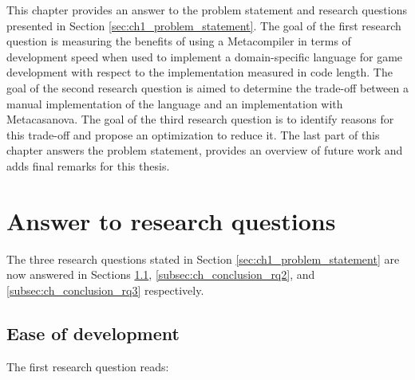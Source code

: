 This chapter provides an answer to the problem statement and research questions presented in Section \ref{sec:ch1_problem_statement}. The goal of the first research question is measuring the benefits of using a Metacompiler in terms of development speed when used to implement a domain-specific language for game development with respect to the implementation measured in code length. The goal of the second research question is aimed to determine the trade-off between a manual implementation of the language and an implementation with Metacasanova. The goal of the third research question is to identify reasons for this trade-off and propose an optimization to reduce it. The last part of this chapter answers the problem statement, provides an overview of future work and adds final remarks for this thesis.

\section{Answer to research questions}
\label{sec:ch_conclusion_answer_research_questions}
The three research questions stated in Section \ref{sec:ch1_problem_statement} are now answered  in Sections \ref{subsec:ch_conclusion_rq1}, \ref{subsec:ch_conclusion_rq2}, and \ref{subsec:ch_conclusion_rq3} respectively.

\subsection{Ease of development}
\label{subsec:ch_conclusion_rq1}

The first research question reads:\\\\
\researchQuestion{\rqContentOne}\\\\

